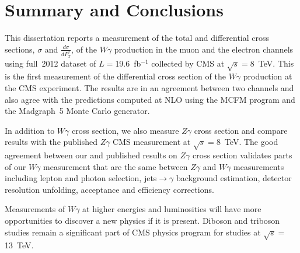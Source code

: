 \chapter{Summary and Conclusions}
\label{sec:Conclusions}

This dissertation reports a measurement of the total and differential cross sections, $\sigma$ and $\frac{d\sigma}{dP_T^{\gamma}}$, of the $W\gamma$ production in the muon and the electron channels using full~2012 dataset of $L=$19.6~fb$^{-1}$ collected by CMS at $\sqrt{s}=$8~TeV. This is the first measurement of the differential cross section of the $W\gamma$ production at the CMS experiment. The results are in an agreement between two channels and also agree with the predictions computed at NLO using the MCFM program and the Madgraph~5 Monte Carlo generator.

In addition to $W\gamma$ cross section, we also measure $Z\gamma$ cross section and compare results with the published $Z\gamma$ CMS measurement at $\sqrt{s}=$8~TeV. The good agreement between our and published results on $Z\gamma$ cross section validates parts of our $W\gamma$ measurement that are the same between $Z\gamma$ and $W\gamma$ measurements including lepton and photon selection, jets$\rightarrow\gamma$ background estimation, detector resolution unfolding, acceptance and efficiency corrections.

Measurements of $W\gamma$ at higher energies and luminosities will have more opportunities to discover a new physics if it is present. Diboson and triboson studies remain a significant part of CMS physics program for studies at $\sqrt{s}=$13~TeV.

